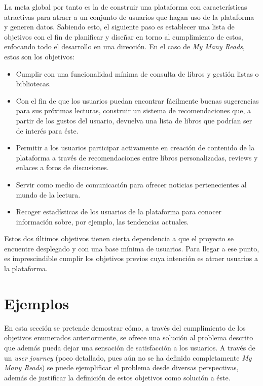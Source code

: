 La meta global por tanto es la de construir una plataforma con características atractivas para atraer a un conjunto de usuarios que hagan uso de la plataforma y generen datos. Sabiendo esto, el siguiente paso es establecer una lista de objetivos con el fin de planificar y diseñar en torno al cumplimiento de estos, enfocando todo el desarrollo en una dirección. En el caso de \textit{My Many Reads}, estos son los objetivos:

\begin{itemize}
    \item Cumplir con una funcionalidad mínima de consulta de libros y gestión listas o bibliotecas.
    \item Con el fin de que los usuarios puedan encontrar fácilmente buenas sugerencias para sus próximas lecturas, construir un sistema de recomendaciones que, a partir de los gustos del usuario, devuelva una lista de libros que podrían ser de interés para éste.
    \item Permitir a los usuarios participar activamente en creación de contenido de la plataforma a través de recomendaciones entre libros personalizadas, reviews y enlaces a foros de discusiones.
    \item Servir como medio de comunicación para ofrecer noticias pertenecientes al mundo de la lectura.
    \item Recoger estadísticas de los usuarios de la plataforma para conocer información sobre, por ejemplo, las tendencias actuales.
\end{itemize}

Estos dos últimos objetivos tienen cierta dependencia a que el proyecto se encuentre desplegado y con una base mínima de usuarios. Para llegar a ese punto, es imprescindible cumplir los objetivos previos cuya intención es atraer usuarios a la plataforma.

\section{Ejemplos}

En esta sección se pretende demostrar cómo, a través del cumplimiento de los objetivos enumerados anteriormente, se ofrece una solución al problema descrito que además pueda dejar una sensación de satisfacción a los usuarios. A través de un \textit{user journey} (poco detallado, pues aún no se ha definido completamente \textit{My Many Reads}) se puede ejemplificar el problema desde diversas perspectivas, además de justificar la definición de estos objetivos como solución a éste.